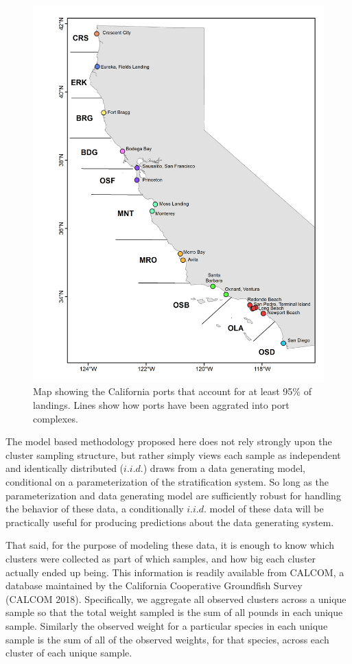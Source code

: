 \documentclass[12pt]{article}
\begin{document}
\begin{figure}[h!]
\centering
\includegraphics[width=\textwidth]{./pictures/COMX_Ports_Final.png}
\caption{Map showing the California ports that account for at least 95\% of 
landings. Lines show how ports have been aggrated into port complexes.}
\label{portMap}
\end{figure}


The model based methodology proposed here does not rely strongly upon
the cluster sampling structure, but rather simply views each sample as
independent and identically distributed (\(i.i.d.\)) draws from a data
generating model, conditional on a parameterization of the
stratification system. So long as the parameterization and data
generating model are sufficiently robust for handling the behavior of
these data, a conditionally \(i.i.d.\) model of these data will be
practically useful for producing predictions about the data generating
system.

That said, for the purpose of modeling these data, it is enough to know
which clusters were collected as part of which samples, and how big each
cluster actually ended up being. This information is readily available
from CALCOM, a database maintained by the California Cooperative
Groundfish Survey (CALCOM 2018). Specifically, we aggregate all observed
clusters across a unique sample so that the total weight sampled is the
sum of all pounds in each unique sample. Similarly the observed weight
for a particular species in each unique sample is the sum of all of the
observed weights, for that species, across each cluster of each unique
sample.
\end{document}
